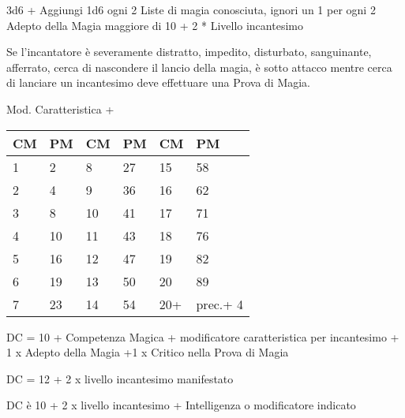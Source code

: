 \documentclass[landscape,10pt,a4paper]{article}
\begin{document}
\begin{multicols}{2}
\begin{dmbox}[title=Prova di Magia - pagina \pageref{magieprovadimagia}]
3d6 + Aggiungi 1d6 ogni 2 Liste di magia conosciuta, ignori un 1 per ogni 2 Adepto della Magia maggiore di 10 + 2 * Livello incantesimo\\
\end{dmbox}

\begin{dmbox}[title=Distratto - pagina \pageref{magiedistratto}]
Se l'incantatore è severamente distratto, impedito, disturbato, sanguinante, afferrato, cerca di nascondere il lancio della magia, è sotto attacco mentre cerca di lanciare un incantesimo deve effettuare una Prova di Magia.
\end{dmbox}


\begin{dmbox}[title=Punti Magia - pagina \pageref{magiepuntimagia}]

Mod. Caratteristica + \\

\noindent\begin{tabularx}{0.45\textwidth}{XX|XX|XX}
\textbf{CM} & \textbf{PM}&\textbf{CM} & \textbf{PM}&\textbf{CM} & \textbf{PM}\\
\hline
1&2 &8&27&15&58\\
2&4&9&36&16&62\\
3&8&10&41&17&71\\
4&10&11&43&18&76\\
5&16&12&47&19&82\\
6&19&13&50&20&89\\
7&23&14&54&20+&prec.+ 4
\end{tabularx}

\end{dmbox}


\begin{dmbox}[title=Tiro Salvezza Incantesimo - pagina \pageref{magietirosalvezza}]
DC = 10 + Competenza Magica + modificatore caratteristica per incantesimo + 1 x Adepto della Magia +1 x Critico nella Prova di Magia
\end{dmbox}


\begin{dmbox}[title=Tiro Salvezza Magia da Oggetto - pagina \pageref{tirosalvezzaincoggetto}]
DC = 12 + 2 x livello incantesimo manifestato
\end{dmbox}

\begin{dmbox}[title=Tiro Salvezza Incantesimo Mostro - pagina \pageref{tirosalvezzainccmostro}]
DC è 10 + 2 x livello incantesimo + Intelligenza o modificatore indicato
\end{dmbox}


\end{multicols}
\end{document}
